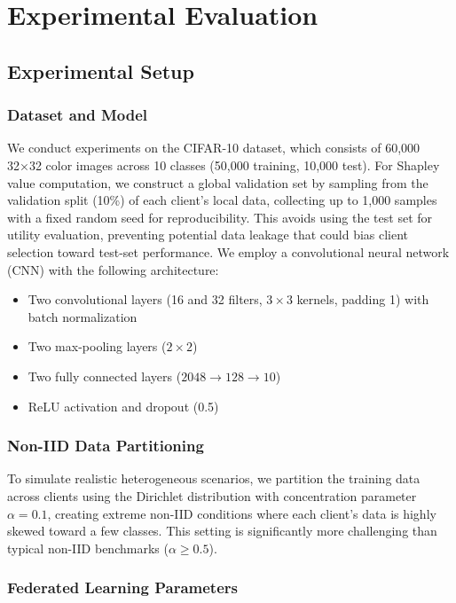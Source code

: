 \section{Experimental Evaluation}

\subsection{Experimental Setup}

\subsubsection{Dataset and Model}

We conduct experiments on the CIFAR-10 dataset, which consists of 60,000 32×32 color images across 10 classes (50,000 training, 10,000 test). For Shapley value computation, we construct a global validation set by sampling from the validation split (10\%) of each client's local data, collecting up to 1,000 samples with a fixed random seed for reproducibility. This avoids using the test set for utility evaluation, preventing potential data leakage that could bias client selection toward test-set performance. We employ a convolutional neural network (CNN) with the following architecture:
\begin{itemize}
\item Two convolutional layers (16 and 32 filters, $3 \times 3$ kernels, padding 1) with batch normalization
\item Two max-pooling layers ($2 \times 2$)
\item Two fully connected layers ($2048 \to 128 \to 10$)
\item ReLU activation and dropout (0.5)
\end{itemize}

\subsubsection{Non-IID Data Partitioning}

To simulate realistic heterogeneous scenarios, we partition the training data across clients using the Dirichlet distribution with concentration parameter $\alpha = 0.1$, creating extreme non-IID conditions where each client's data is highly skewed toward a few classes. This setting is significantly more challenging than typical non-IID benchmarks ($\alpha \geq 0.5$).

\subsubsection{Federated Learning Parameters}

